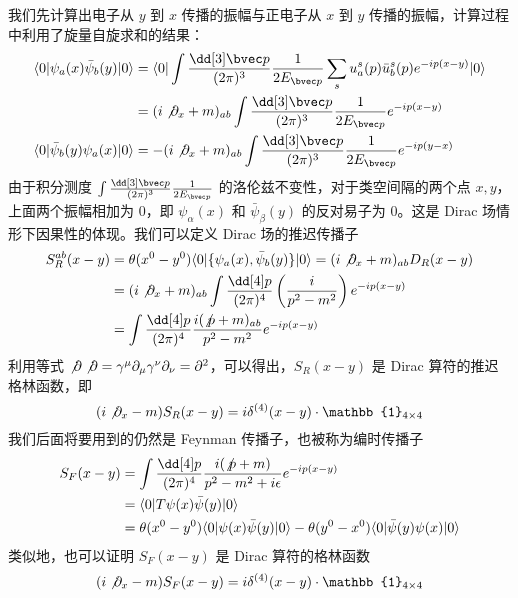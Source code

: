 
我们先计算出电子从 $y$ 到 $x$ 传播的振幅与正电子从 $x$ 到 $y$ 传播的振幅，计算过程中利用了旋量自旋求和的结果：
\begin{equation}
\begin{aligned}
\langle 0 | \psi_a(x) \bar\psi_b(y)|0\rangle &= \langle 0|\int \frac{\dd[3] \bvec p}{(2\pi)^3} \frac{1}{2E_{\bvec p}}\sum_s u^s_a(p)\bar u^s_b(p) e^{-ip(x-y)} |0\rangle\\
&=(i\not \partial_x+m)_{ab}\int \frac{\dd[3] \bvec p}{(2\pi)^3}\frac{1}{2E_{\bvec p}}e^{-ip(x-y)}\\
\langle 0 | \bar\psi_b(y) \psi_a(x)|0\rangle &=-(i\not\partial_x +m)_{ab}\int \frac{\dd[3] \bvec p}{(2\pi)^3}\frac{1}{2E_{\bvec p}}e^{-ip(y-x)}
\end{aligned}
\end{equation}
由于积分测度 $\int \frac{\dd[3]\bvec  p}{(2\pi)^3}\frac{1}{2E_{\bvec p}}$ 的洛伦兹不变性，对于类空间隔的两个点 $x,y$，上面两个振幅相加为 $0$，即 $\psi_\alpha(x)$ 和 $\bar\psi_\beta(y)$ 的反对易子为 $0$。这是 Dirac 场情形下因果性的体现。我们可以定义 Dirac 场的推迟传播子
\begin{equation}
\begin{aligned}
S^{ab}_R(x-y)&=\theta(x^0-y^0) \langle 0| \{\psi_a(x),\bar\psi_b(y) \} | 0\rangle = (i\not \partial_x+m)_{ab} D_R(x-y)\\
&=(i\not\partial_x+m)_{ab}\int \frac{\dd[4] p}{(2\pi)^4}\left(\frac{i}{p^2-m^2}\right)e^{-ip(x-y)}\\
&=\int \frac{\dd[4] p}{(2\pi)^4}\frac{i(\not p+m)_{ab}}{p^2-m^2}e^{-ip(x-y)}
\end{aligned}
\end{equation}
利用等式 $\not \partial \not \partial=\gamma^\mu\partial_\mu\gamma^\nu\partial_\nu=\partial^2$，可以得出，$S_R(x-y)$ 是 Dirac 算符的推迟格林函数，即
\[
(i\not \partial_x-m)S_R(x-y) = i\delta^{(4)}(x-y) \cdot \mathbb{1}_{4\times 4}
\]
我们后面将要用到的仍然是 Feynman 传播子，也被称为编时传播子
\begin{equation}
\begin{aligned}
S_F(x-y)&=\int \frac{\dd[4] p}{(2\pi)^4}\frac{i(\not p+m)}{p^2-m^2+i\epsilon}e^{-ip(x-y)}\\
\notag&=\langle 0|T\psi(x)\bar\psi(y)|0\rangle \\
\notag&=\theta(x^0-y^0) \langle 0|\psi(x)\bar\psi(y) |0\rangle -\theta(y^0-x^0)\langle 0|\bar\psi(y)\psi(x)|0\rangle
\end{aligned}
\end{equation}
类似地，也可以证明 $S_F(x-y)$ 是 Dirac 算符的格林函数
\[
(i\not \partial_x-m)S_F(x-y) = i\delta^{(4)}(x-y) \cdot \mathbb{1}_{4\times 4}
\]